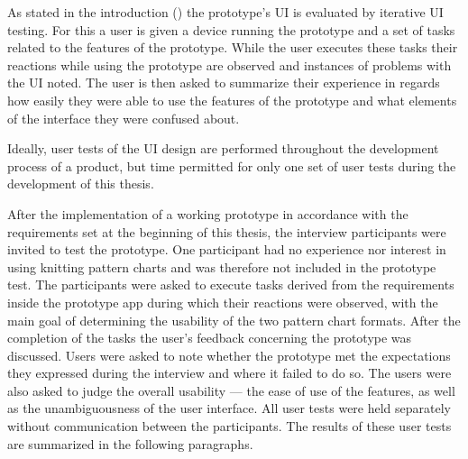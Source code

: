 As stated in the introduction () the prototype's \gls{UI} is evaluated by iterative \gls{UI} testing. For this a user is given a device running the prototype and a set of tasks related to the features of the prototype. While the user executes these tasks their reactions while using the prototype are observed and instances of problems with the \gls{UI} noted. The user is then asked to summarize their experience in regards how easily they were able to use the features of the prototype and what elements of the interface they were confused about.

Ideally, user tests of the \gls{UI} design are performed throughout the development process of a product, but time permitted for only one set of user tests during the development of this thesis.

After the implementation of a working prototype in accordance with the requirements set at the beginning of this thesis, the interview participants were invited to test the prototype. One participant had no experience nor interest in using knitting pattern charts and was therefore not included in the prototype test.
The participants were asked to execute tasks derived from the requirements inside the prototype app during which their reactions were observed, with the main goal of determining the usability of the two pattern chart formats. After the completion of the tasks the user's feedback concerning the prototype was discussed. Users were asked to note whether the prototype met the expectations they expressed during the interview and where it failed to do so. The users were also asked to judge the overall usability --- the ease of use of the features, as well as the unambiguousness of the user interface. All user tests were held separately without communication between the participants. The results of these user tests are summarized in the following paragraphs.

